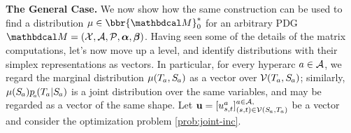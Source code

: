\documentclass[twoside]{article}
\begin{document}
\textbf{The General Case.}
We now show how the same construction can be used to find
 a distribution $\mu \in \bbr{\dg M}^*_0$
for an arbitrary PDG $\dg M = (\X, \Ar, \mathcal P, \balpha, \bbeta)$.
Having seen some of the details of the matrix computations, let's now move up a level,
and identify distributions with their simplex representations as vectors.
In particular, for every hyperarc $a \in \mathcal A$, we regard the marginal distribution $\mu(\Tgt a, \Src a)$ as a vector over $\V(\Tgt a, \Src a)$;
similarly, $\mu(\Src a)p\ssub a(\Tgt a | \Src a)$ is a joint distribution over the same variables, and may be regarded as a vector of the same shape.
%
Let $\mat u = [u^a_{s,t}]^{a \in \Ar,}_{ (s,t) \in \V(\Src a, \Tgt a)}$
be a vector
%
and consider the optimization problem \eqref{prob:joint-inc}.
\end{document}
